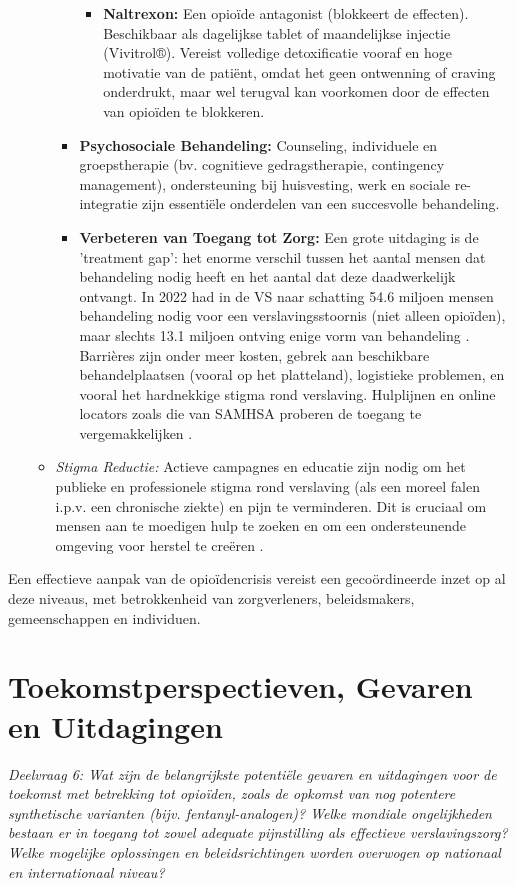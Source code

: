 \documentclass[11pt, a4paper]{report} %
\begin{document}
\begin{itemize}
\begin{itemize}
\begin{itemize}
\begin{itemize}
                            \item \textbf{Naltrexon:} Een opioïde antagonist (blokkeert de effecten). Beschikbaar als dagelijkse tablet of maandelijkse injectie (Vivitrol®). Vereist volledige detoxificatie vooraf en hoge motivatie van de patiënt, omdat het geen ontwenning of craving onderdrukt, maar wel terugval kan voorkomen door de effecten van opioïden te blokkeren.
                        \end{itemize}
                    \item \textbf{Psychosociale Behandeling:} Counseling, individuele en groepstherapie (bv. cognitieve gedragstherapie, contingency management), ondersteuning bij huisvesting, werk en sociale re-integratie zijn essentiële onderdelen van een succesvolle behandeling.
                    \item \textbf{Verbeteren van Toegang tot Zorg:} Een grote uitdaging is de 'treatment gap': het enorme verschil tussen het aantal mensen dat behandeling nodig heeft en het aantal dat deze daadwerkelijk ontvangt. In 2022 had in de VS naar schatting 54.6 miljoen mensen behandeling nodig voor een verslavingsstoornis (niet alleen opioïden), maar slechts 13.1 miljoen ontving enige vorm van behandeling \parencite{SAMHSA2022NSDUH}. Barrières zijn onder meer kosten, gebrek aan beschikbare behandelplaatsen (vooral op het platteland), logistieke problemen, en vooral het hardnekkige stigma rond verslaving. Hulplijnen en online locators zoals die van SAMHSA proberen de toegang te vergemakkelijken \parencite{SAMHSATreatmentLocator}.
                \end{itemize}
            \item \textit{Stigma Reductie:} Actieve campagnes en educatie zijn nodig om het publieke en professionele stigma rond verslaving (als een moreel falen i.p.v. een chronische ziekte) en pijn te verminderen. Dit is cruciaal om mensen aan te moedigen hulp te zoeken en om een ondersteunende omgeving voor herstel te creëren \parencite{CDCStigmaReduction}.
        \end{itemize}
\end{itemize}
Een effectieve aanpak van de opioïdencrisis vereist een gecoördineerde inzet op al deze niveaus, met betrokkenheid van zorgverleners, beleidsmakers, gemeenschappen en individuen.


\chapter{Toekomstperspectieven, Gevaren en Uitdagingen}
\label{chap:toekomst}
\textit{Deelvraag 6: Wat zijn de belangrijkste potentiële gevaren en uitdagingen voor de toekomst met betrekking tot opioïden, zoals de opkomst van nog potentere synthetische varianten (bijv. fentanyl-analogen)? Welke mondiale ongelijkheden bestaan er in toegang tot zowel adequate pijnstilling als effectieve verslavingszorg? Welke mogelijke oplossingen en beleidsrichtingen worden overwogen op nationaal en internationaal niveau?}
\end{document}
